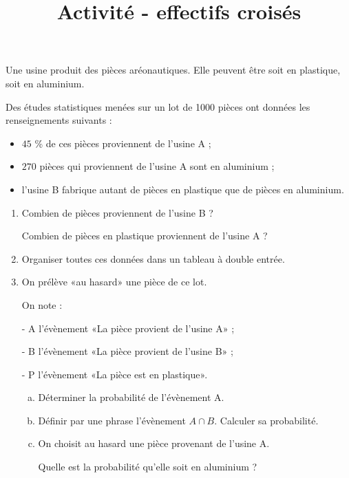 \documentclass[xcolor=table]{beamer}
\title{Activité - effectifs croisés}
\begin{document}
\footnotesize

\begin{frame}
	Une usine produit des pièces aréonautiques. Elle peuvent être soit en plastique, soit en aluminium.

	Des études statistiques menées sur un lot de 1000 pièces ont données les renseignements suivants :
	\begin{itemize}
		\item $45$ \% de ces pièces proviennent de l'usine A ;
		\item $270$ pièces qui proviennent de l'usine A sont en aluminium ;
		\item l'usine B fabrique autant de pièces en plastique que de pièces en aluminium.
	\end{itemize}

	\begin{enumerate}
		\item Combien de pièces proviennent de l'usine B ? %

		      Combien de pièces en plastique proviennent de l'usine A ? %
		\item Organiser toutes ces données dans un tableau à double entrée.
		\item On prélève «au hasard» une pièce de ce lot.

		      On note :

		      - A l'évènement «La pièce provient de l'usine A» ;

		      - B l'évènement «La pièce provient de l'usine B» ;

		      - P l'évènement «La pièce est en plastique».
		      \begin{enumerate}[a.]
			      \item Déterminer la probabilité de l'évènement A.
			      \item Définir par une phrase l'évènement $A ∩ B$. Calculer sa probabilité.
			      \item On choisit au hasard une pièce provenant de l'usine A.

			            Quelle est la probabilité qu'elle soit en aluminium ?
		      \end{enumerate}
	\end{enumerate}
\end{frame}
\end{document}
